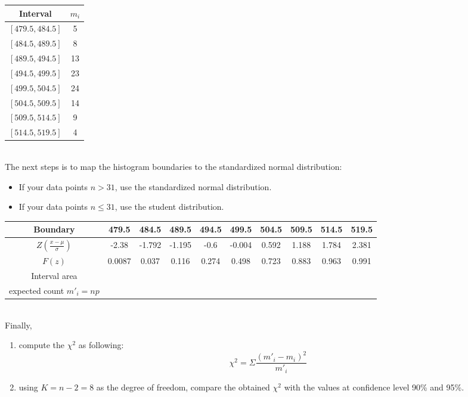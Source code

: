 \documentclass[a4paper,11pt,dvipsnames]{book}
\begin{document}
\begin{tabular}{|c|c|}
\hline 
Interval & $m_i$ \\ 
\hline 
$\left[ 479.5, 484.5 \right]$ & 5 \\ 
\hline 
$\left[ 484.5, 489.5 \right]$ & 8 \\ 
\hline 
$\left[ 489.5, 494.5 \right]$ & 13 \\ 
\hline 
$\left[ 494.5, 499.5 \right]$ & 23 \\ 
\hline 
$\left[ 499.5, 504.5 \right]$ & 24 \\ 
\hline 
$\left[ 504.5,509.5 \right]$ & 14 \\ 
\hline 
$\left[ 509.5, 514.5 \right]$ & 9 \\ 
\hline 
$\left[  514.5, 519.5 \right]$ & 4 \\ 
\hline 
\end{tabular} \\


The next steps is to map the histogram boundaries to the standardized normal distribution:
\begin{itemize}
\item If your data points $n>31$, use the standardized normal distribution.
\item If your data points $n \leq 31$, use the student distribution.
\end{itemize} 

\hspace{-2cm}
\begin{tabular}{|c|c|c|c|c|c|c|c|c|c|}
\hline 
Boundary & 479.5 & 484.5 & 489.5 & 494.5 & 499.5 & 504.5 & 509.5  & 514.5 &  519.5 \\ 
\hline 
$Z(\frac{x-\mu}{\sigma})$ &  -2.38 & -1.792 & -1.195 & -0.6  & -0.004 & 0.592 &  1.188 & 1.784 & 2.381 \\
\hline 
$F(z)$ & 0.0087 & 0.037 & 0.116 &  0.274 & 0.498 & 0.723 &  0.883  & 0.963 & 0.991 \\
\hline 
Interval area & & & & & & & & & \\
\hline
expected count $m'_i = np$ & & & & & & & & & \\ 
\hline
\end{tabular} \\

Finally, 
\begin{enumerate}
\item compute the $\chi^2$ as following:
\begin{equation}
\chi^2 = \Sigma \frac{(m'_i - m_i)^2}{m'_i}
\end{equation}
\item using $K=n-2=8$ as the degree of freedom, compare the obtained $\chi^2$ with the values at confidence level 90\% and 95\%.
\end{enumerate}
\end{document}
